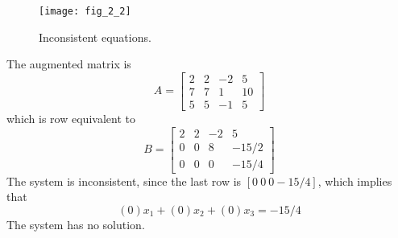 \documentclass[../main.tex]{subfiles}
\begin{document}
\begin{figure}
	\centering
	\texttt{[image: fig\_2\_2]}
	\caption{ Inconsistent equations.}
	\label{fig:fig_2_2}
\end{figure}



The augmented matrix is
$$
A=\left[\begin{array}{ccc|c}
2 & 2 & -2 & 5 \\
7 & 7 & 1 & 10 \\
5 & 5 & -1 & 5
\end{array}\right]
$$
which is row equivalent to
$$
B=\left[\begin{array}{ccc|c}
2 & 2 & -2 & 5 \\
0 & 0 & 8 & -15 / 2 \\
0 & 0 & 0 & -15 / 4
\end{array}\right]
$$
The system is inconsistent, since the last row is $[0~0~0 - 15/4]$, which implies that
$$
(0) x_{1}+(0) x_{2}+(0) x_{3}=-15 / 4
$$
The system has no solution.
\end{document}
